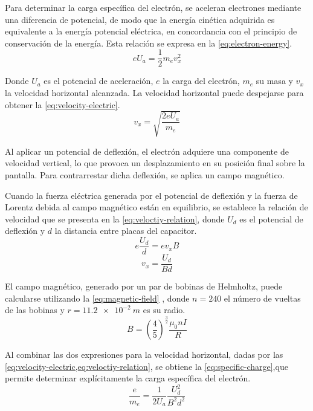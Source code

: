 Para determinar la carga específica del electrón, se aceleran electrones mediante
una diferencia de potencial, de modo que la energía cinética adquirida es
equivalente a la energía potencial eléctrica, en concordancia con el principio
de conservación de la energía.
Esta relación se expresa en la \cref{eq:electron-energy}.
\begin{equation}\label{eq:electron-energy}
  e U_a =\frac{1}{2} m_e v^{2}_{x}
\end{equation}

Donde \(U_a\) es el potencial de aceleración, \(e\) la carga del electrón,
\(m_e\) su masa y \(v_x\) la velocidad horizontal alcanzada.
La velocidad horizontal puede despejarse para obtener la
\cref{eq:velocity-electric}.
\begin{equation}\label{eq:velocity-electric}
  v_x = \sqrt{\frac{2 e U_a}{m_e}}
\end{equation}

Al aplicar un potencial de deflexión, el electrón adquiere una componente de
velocidad vertical, lo que provoca un desplazamiento en su posición final sobre
la pantalla.
Para contrarrestar dicha deflexión, se aplica un campo magnético.

Cuando la fuerza eléctrica generada por el potencial de deflexión y la fuerza de
Lorentz debida al campo magnético están en equilibrio, se establece la relación
de velocidad que se presenta en la \cref{eq:veloctiy-relation}, donde \(U_d\) es
el potencial de deflexión y \(d\) la distancia entre placas del capacitor.
\begin{equation*}
  e \frac{U_d}{d} = e v_x B
\end{equation*}
\begin{equation}\label{eq:veloctiy-relation}
  v_x = \frac{U_d}{Bd}
\end{equation}

El campo magnético, generado por un par de bobinas de Helmholtz,
puede calcularse utilizando la \cref{eq:magnetic-field} \cite{jackson-1998},
donde \(n = 240 \) el número de vueltas de las bobinas y \(r = \qty{11.2e-2}{m}\)
es su radio.
\begin{equation}\label{eq:magnetic-field}
  B = \left( \frac{4}{5} \right)^{\frac{3}{2}} \frac{\mu_0 n I}{R}
\end{equation}

Al combinar las dos expresiones para la velocidad horizontal, dadas por las
\cref{eq:velocity-electric,eq:veloctiy-relation}, se obtiene la
\cref{eq:specific-charge},que permite determinar explícitamente la carga
específica del electrón.
\begin{equation}\label{eq:specific-charge}
  \frac{e}{m_e}=\frac{1}{2U_a}\frac{U^2_d}{B^2d^2}
\end{equation}

